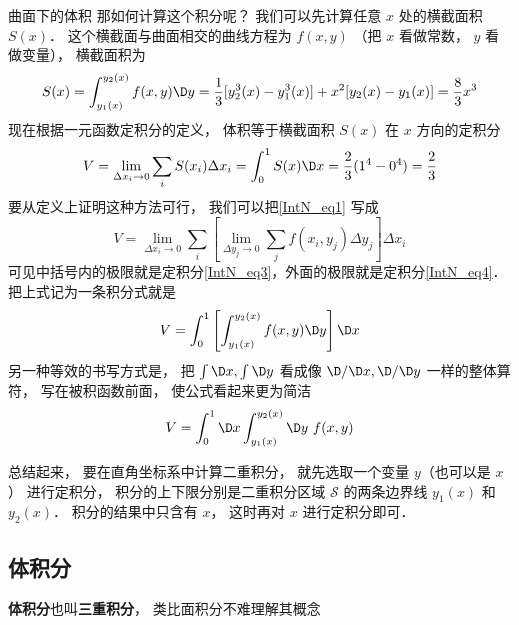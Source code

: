 \begin{exam}{曲面下的体积}
那如何计算这个积分呢？ 我们可以先计算任意 $x$ 处的横截面积 $S(x)$． 这个横截面与曲面相交的曲线方程为 $f(x,y)$ （把 $x$ 看做常数， $y$ 看做变量）， 横截面积为
\begin{equation}\label{IntN_eq3}
S(x) = \int_{y_1(x)}^{y_2(x)} f(x,y) \D y = \frac 13 [y_2^3(x) - y_1^3(x)] + x^2[y_2(x) - y_1(x)] = \frac 83 x^3
\end{equation}
现在根据一元函数定积分的定义， 体积等于横截面积 $S(x)$ 在 $x$ 方向的定积分
\begin{equation}\label{IntN_eq4}
V = \lim_{\Delta x_i\to 0} \sum_{i} S(x_i) \Delta x_i = \int_0^1 S(x) \D x = \frac 23 (1^4 -0^4) = \frac 23
\end{equation}
要从定义上证明这种方法可行， 我们可以把\autoref{IntN_eq1} 写成
\begin{equation}\label{}
V = \lim_{\Delta x_i\to 0} \sum_{i} \left[\lim_{\Delta y_j\to 0}\sum_{j} f(x_i,y_j) \Delta y_j \right] \Delta x_i
\end{equation}
可见中括号内的极限就是定积分\autoref{IntN_eq3}，外面的极限就是定积分\autoref{IntN_eq4}． 把上式记为一条积分式就是
\begin{equation}
V = \int_0^1 \left[\int_{y_1(x)}^{y_2(x)} f(x,y) \D y\right] \D x
\end{equation}
另一种等效的书写方式是， 把 $\int \D x, \int \D y$ 看成像 $\D/\D x, \D/\D y$ 一样的整体算符， 写在被积函数前面， 使公式看起来更为简洁
\begin{equation}
V = \int_0^1\D x \int_{y_1(x)}^{y_2(x)} \D y  \,\, f(x,y)
\end{equation}
\end{exam}

总结起来， 要在直角坐标系中计算二重积分， 就先选取一个变量 $y$（也可以是 $x$） 进行定积分， 积分的上下限分别是二重积分区域 $\mathcal{S}$ 的两条边界线 $y_1(x)$ 和 $y_2(x)$． 积分的结果中只含有 $x$， 这时再对 $x$ 进行定积分即可．

\subsection{体积分}
\textbf{体积分}也叫\textbf{三重积分}， 类比面积分不难理解其概念

